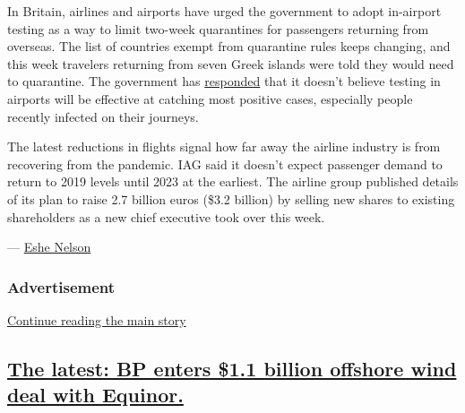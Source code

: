 In Britain, airlines and airports have urged the government to adopt
in-airport testing as a way to limit two-week quarantines for passengers
returning from overseas. The list of countries exempt from quarantine
rules keeps changing, and this week travelers returning from seven Greek
islands were told they would need to quarantine. The government has
\href{https://www.bbc.co.uk/news/uk-54031912}{responded} that it doesn't
believe testing in airports will be effective at catching most positive
cases, especially people recently infected on their journeys.

The latest reductions in flights signal how far away the airline
industry is from recovering from the pandemic. IAG said it doesn't
expect passenger demand to return to 2019 levels until 2023 at the
earliest. The airline group published details of its plan to raise 2.7
billion euros (\$3.2 billion) by selling new shares to existing
shareholders as a new chief executive took over this week.

--- \href{https://www.nytimes3xbfgragh.onion/by/eshe-nelson}{Eshe
Nelson}

\hypertarget{advertisement-3}{%
\subsubsection{Advertisement}\label{advertisement-3}}

\protect\hyperlink{after-dfp-ad-mid4}{Continue reading the main story}

\hypertarget{the-latest-bp-enters-11-billion-offshore-wind-deal-with-equinor}{%
\subsection{\texorpdfstring{\protect\hyperlink{the-latest-bp-enters-1-1-billion-offshore-wind-deal-with-equinor}{The
latest: BP enters \$1.1 billion offshore wind deal with
Equinor.}}{The latest: BP enters \$1.1 billion offshore wind deal with Equinor.}}\label{the-latest-bp-enters-11-billion-offshore-wind-deal-with-equinor}}

